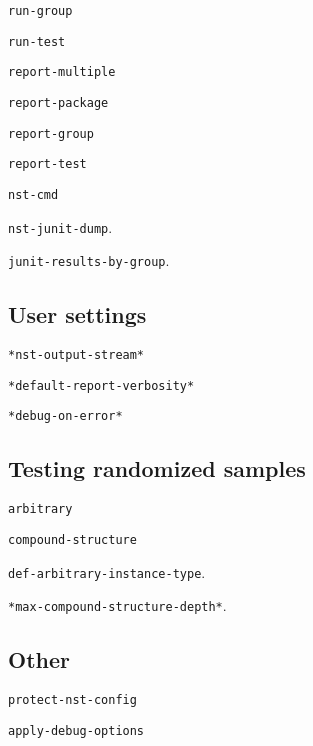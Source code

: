 \texttt{run-group}

\texttt{run-test}
             
\texttt{report-multiple}

\texttt{report-package}

\texttt{report-group}

\texttt{report-test}
             
\texttt{nst-cmd}

\texttt{nst-junit-dump}.

\texttt{junit-results-by-group}.

\subsection{User settings}
\texttt{*nst-output-stream*}

\texttt{*default-report-verbosity*}

\texttt{*debug-on-error*}

\subsection{Testing randomized samples}
\texttt{arbitrary}

\texttt{compound-structure}

\texttt{def-arbitrary-instance-type}.

\texttt{*max-compound-structure-depth*}.

\subsection{Other}
\texttt{protect-nst-config}

\texttt{apply-debug-options}


